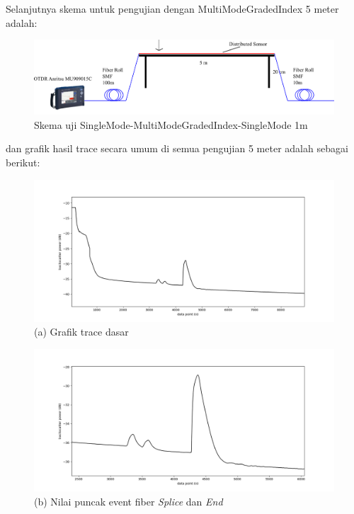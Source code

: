 \documentclass[12pt]{article}
\begin{document}
	Selanjutnya skema untuk pengujian dengan MultiModeGradedIndex 5 meter adalah:
	
	\begin{figure}[!h]
		\centering
		\captionsetup{justification=centering}
		\includegraphics[width=0.7\linewidth]{images/Bab_4/uji_5m}
		\caption[Trace SMF-SMF]{\small{Skema uji SingleMode-MultiModeGradedIndex-SingleMode 1m}}
	\end{figure}
	
	dan grafik hasil trace secara umum di semua pengujian 5 meter adalah sebagai berikut:
	
	\begin{figure}[!h]
		\centering
		\captionsetup{justification=centering}
		\includegraphics[width=\textwidth]{images/Bab_4/Bab_4_5e1}	
		\caption{\small{(a) Grafik trace dasar}}
	\end{figure}
	
	\newpage
	\begin{figure}[!h]
		\centering
		\captionsetup{justification=centering}
		\includegraphics[width=\textwidth]{images/Bab_4/Bab_4_5e2}	
		\caption{\small{(b) Nilai puncak event fiber \textit{Splice} dan \textit{End}}}
	\end{figure}
	
\end{document}
